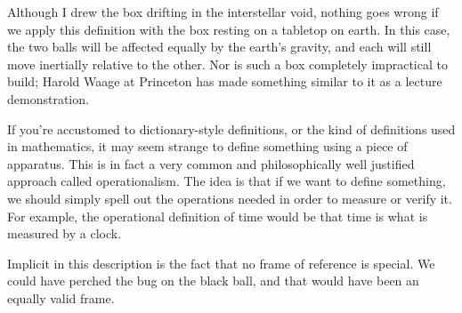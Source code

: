 Although I drew the box drifting in the interstellar void, nothing goes wrong if we apply this definition
with the box resting on a tabletop on earth. In this case, the two balls will be affected equally by the earth's
gravity, and each will still move inertially relative to the other.
Nor is such a box completely impractical to build;
Harold Waage at Princeton has made something similar to it as a lecture demonstration.

If you're accustomed to dictionary-style definitions, or the kind of definitions used in mathematics,
it may seem strange to define something using a piece of apparatus.
This is in fact a very common and philosophically well justified approach called operationalism.
The idea is that if we want to define something,
we should simply spell out the operations needed in order to measure or verify it.
For example, the operational definition of time would be that time is what is measured by a clock.

Implicit in this description is the fact that no frame of reference is special. We could have perched the
bug on the black ball, and that would have been an equally valid frame.
